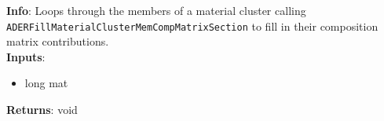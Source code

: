 \textbf{Info}: Loops through the members of a material cluster calling
\texttt{ADERFillMaterialClusterMemCompMatrixSection} to fill in their 
composition matrix contributions. \\

\noindent \textbf{Inputs}:
\begin{itemize}
\item{long mat}
\end{itemize}

\noindent \textbf{Returns}: void
